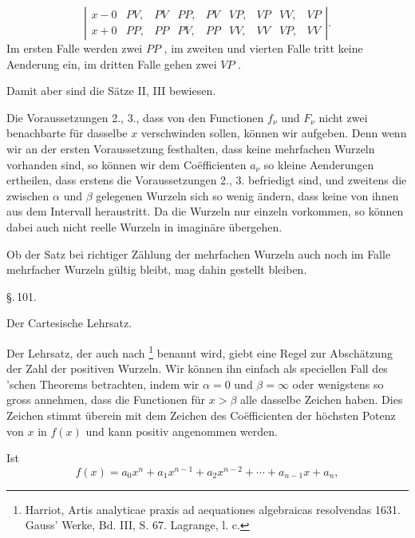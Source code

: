 \[
\left|\begin{array}{c|cc|cc|cc|cc}
x-0 & PV, & PV & PP, & PV & VP, & VP & VV, & VP \\ \hline
x+0 & PP, & PP & PV, & PP & VV, & VV & VP, & VV
\end{array}\right|
\text{.}
\]
Im ersten Falle werden zwei $PP$ , im zweiten und vierten Falle tritt keine Aenderung ein, im dritten Falle gehen zwei $VP$ .

Damit aber sind die Sätze II, III bewiesen.

Die Voraussetzungen 2., 3., dass von den Functionen $f_\nu$ und $F_\nu$ nicht zwei benachbarte für dasselbe $x$ verschwinden sollen, können wir aufgeben. Denn wenn wir an der ersten Voraussetzung festhalten, dass keine mehrfachen Wurzeln vorhanden sind, so können wir dem Coëfficienten $a_\nu$ so kleine Aenderungen ertheilen, dass erstens die Voraussetzungen 2., 3. befriedigt sind, und zweitens die zwischen $\alpha$ und $\beta$ gelegenen Wurzeln sich so wenig ändern, dass keine von ihnen aus dem Intervall heraustritt. Da die Wurzeln nur einzeln vorkommen, so können dabei auch nicht reelle Wurzeln in imaginäre übergehen.

Ob der Satz bei richtiger Zählung der mehrfachen Wurzeln auch noch im Falle mehrfacher Wurzeln gültig bleibt, mag dahin gestellt bleiben.

\begin{center}
\S.\,101.

Der Cartesische Lehrsatz.
\end{center}

Der  Lehrsatz, der auch nach \footnote{Harriot, Artis analyticae praxis ad aequationes algebraicas resolvendas 1631. Gauss' Werke, Bd. III, S. 67. Lagrange, l. c.} benannt wird, giebt eine Regel zur Abschätzung der Zahl der positiven Wurzeln. Wir können ihn einfach als speciellen Fall des 'schen Theorems betrachten, indem wir $\alpha = 0$ und $\beta = \infty$ oder wenigstens so gross annehmen, dass die Functionen
für $x > \beta$ alle dasselbe Zeichen haben. Dies Zeichen stimmt überein mit dem Zeichen des Coëfficienten der höchsten Potenz von $x$ in $f(x)$ und kann positiv angenommen werden.

Ist
\[
f(x) = a_0 x^n + a_1 x^{n-1} + a_2 x^{n-2} + \cdots + a_{n-1} x + a_n,
\]
